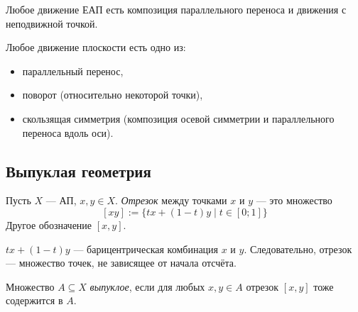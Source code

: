 \documentclass[12pt,a4paper]{article}
\begin{document}
    \begin{corollary}
        Любое движение ЕАП есть композиция параллельного переноса и движения с неподвижной точкой.
    \end{corollary}

    \begin{corollary}
        Любое движение плоскости есть одно из:
        \begin{itemize}
            \item параллельный перенос,
            \item поворот (относительно некоторой точки),
            \item скользящая симметрия (композиция осевой симметрии и параллельного переноса вдоль оси).
        \end{itemize}
    \end{corollary}

    \subsection{Выпуклая геометрия}

    \begin{definition}
        Пусть $X$ --- АП, $x, y \in X$. \emph{Отрезок} между точками $x$ и $y$ --- это множество
        \[[xy] := \{tx + (1-t)y \mid t \in [0; 1]\}\]
        Другое обозначение $[x, y]$.
    \end{definition}

    \begin{remark}
        $tx + (1-t)y$ --- барицентрическая комбинация $x$ и $y$. Следовательно, отрезок --- множество точек, не зависящее от начала отсчёта.
    \end{remark}

    \begin{definition}
        Множество $A \subseteq X$ \emph{выпуклое}, если для любых $x, y \in A$ отрезок $[x, y]$ тоже содержится в $A$.
    \end{definition}
\end{document}
